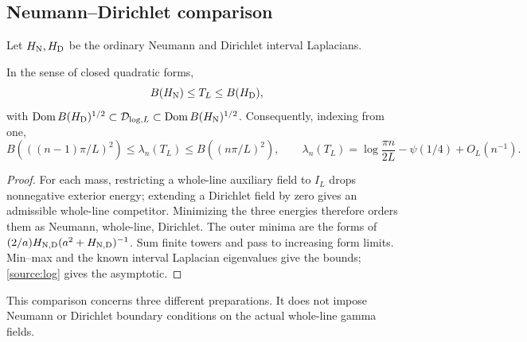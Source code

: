 \subsection{Neumann--Dirichlet comparison}
Let $H_{\rm N},H_{\rm D}$ be the ordinary Neumann and Dirichlet
interval Laplacians.
\begin{theorem}\label{source:bracket}
In the sense of closed quadratic forms,
\[
B(H_{\rm N})\le T_L\le B(H_{\rm D}),
\]
with
$\operatorname{Dom} B(H_{\rm D})^{1/2}\subset\mathcal D_{\log,L}
\subset\operatorname{Dom} B(H_{\rm N})^{1/2}$. Consequently, indexing from one,
\begin{equation}\label{source:eigenvalues}
B(((n-1)\pi/L)^2)\le\lambda_n(T_L)\le B((n\pi/L)^2),
\qquad
\lambda_n(T_L)=\log\frac{\pi n}{2L}-\psi(1/4)+O_L(n^{-1}).
\end{equation}
\end{theorem}
\begin{proof}
For each mass, restricting a whole-line auxiliary field to $I_L$
drops nonnegative exterior energy; extending a Dirichlet field
by zero gives an admissible whole-line competitor. Minimizing
the three energies therefore orders them as Neumann, whole-line,
Dirichlet. The outer minima are the forms of
$(2/a)H_{\rm N,D}(a^2+H_{\rm N,D})^{-1}$.
Sum finite towers and pass to increasing form limits. Min--max
and the known interval Laplacian eigenvalues give the bounds;
\eqref{source:log} gives the asymptotic.
\end{proof}
This comparison concerns three different preparations. It does
not impose Neumann or Dirichlet boundary conditions on the actual
whole-line gamma fields.
